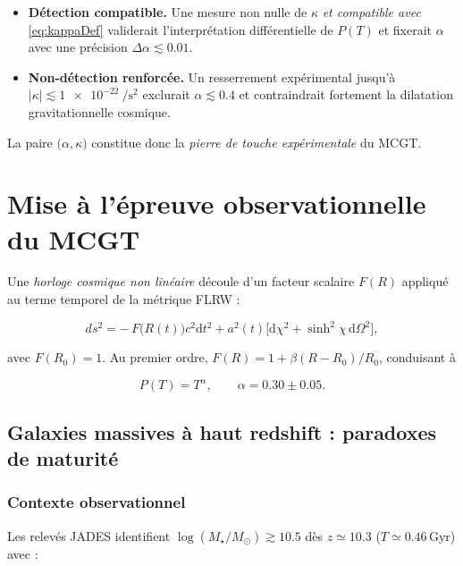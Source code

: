 \documentclass[11pt]{article}
\begin{document}
\begin{itemize}
  \item \textbf{Détection compatible.} 
        Une mesure non nulle de \(\kappa\) \emph{et compatible avec}
        \eqref{eq:kappaDef} validerait l’interprétation différentielle de
        \(P(T)\) et fixerait \(\alpha\) avec une précision
        \(\Delta\alpha\lesssim0.01\).
  \item \textbf{Non-détection renforcée.} 
        Un resserrement expérimental jusqu’à
        \(\lvert\kappa\rvert\lesssim
        \SI{1e-22}{\per\square\second}\) exclurait
        \(\alpha\lesssim0.4\) et contraindrait fortement
        la dilatation gravitationnelle cosmique.
\end{itemize}

La paire \(\bigl(\alpha,\kappa\bigr)\) constitue donc la
\emph{pierre de touche expérimentale} du MCGT.

\section{Mise à l’épreuve observationnelle du MCGT}

Une \emph{horloge cosmique non linéaire} découle d’un facteur scalaire
\(F(R)\) appliqué au terme temporel de la métrique FLRW :

\begin{equation}
\label{eq:metricRenorm_alt}
ds^{2}=
-\,F\!\bigl(R(t)\bigr)c^{2}\mathrm dt^{2}
+a^{2}(t)\bigl[\mathrm d\chi^{2}
+\sinh^{2}\!\chi\,\mathrm d\Omega^{2}\bigr],
\end{equation}

avec \(F(R_{0})=1\). Au premier ordre,
\(F(R)=1+\beta(R-R_{0})/R_{0}\), conduisant à

\begin{equation}
\label{eq:PTpower_alt}
P(T)=T^{\alpha},
\qquad
\alpha=0.30\pm0.05.
\end{equation}

\subsection{Galaxies massives à haut redshift : paradoxes de maturité}

\subsubsection*{Contexte observationnel}

Les relevés \textsc{JADES} identifient
\(\log(M_\star/M_\odot)\gtrsim10.5\) dès \(z\simeq10.3\)
(\(T\simeq0.46\,\mathrm{Gyr}\)) avec :
\end{document}
